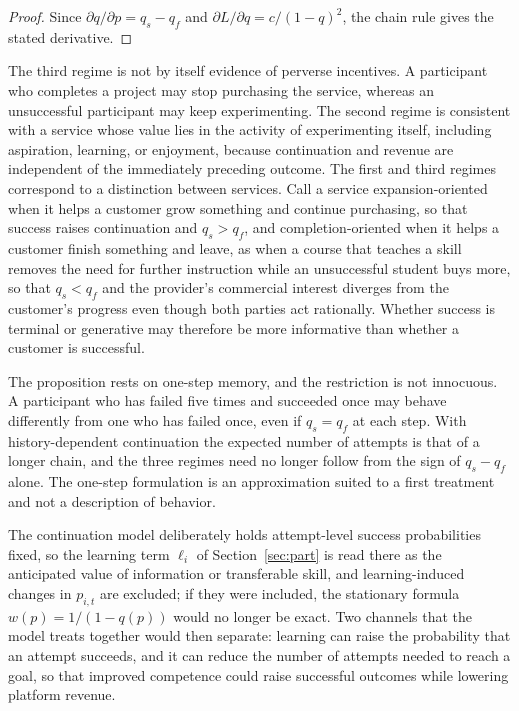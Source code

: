 \documentclass[11pt]{article}
\theoremstyle{remark}
\begin{document}
\begin{proof}
Since $\partial q/\partial p = q_s-q_f$ and $\partial L/\partial q = c/(1-q)^2$, the chain rule gives the stated derivative.
\end{proof}

The third regime is not by itself evidence of perverse incentives. A participant who completes a project may stop purchasing the service, whereas an unsuccessful participant may keep experimenting. The second regime is consistent with a service whose value lies in the activity of experimenting itself, including aspiration, learning, or enjoyment, because continuation and revenue are independent of the immediately preceding outcome. The first and third regimes correspond to a distinction between services. Call a service expansion-oriented when it helps a customer grow something and continue purchasing, so that success raises continuation and $q_s>q_f$, and completion-oriented when it helps a customer finish something and leave, as when a course that teaches a skill removes the need for further instruction while an unsuccessful student buys more, so that $q_s<q_f$ and the provider's commercial interest diverges from the customer's progress even though both parties act rationally. Whether success is terminal or generative may therefore be more informative than whether a customer is successful.

The proposition rests on one-step memory, and the restriction is not innocuous. A participant who has failed five times and succeeded once may behave differently from one who has failed once, even if $q_s=q_f$ at each step. With history-dependent continuation the expected number of attempts is that of a longer chain, and the three regimes need no longer follow from the sign of $q_s-q_f$ alone. The one-step formulation is an approximation suited to a first treatment and not a description of behavior.

The continuation model deliberately holds attempt-level success probabilities fixed, so the learning term $\ell_i$ of Section~\ref{sec:part} is read there as the anticipated value of information or transferable skill, and learning-induced changes in $p_{i,t}$ are excluded; if they were included, the stationary formula $w(p)=1/(1-q(p))$ would no longer be exact. Two channels that the model treats together would then separate: learning can raise the probability that an attempt succeeds, and it can reduce the number of attempts needed to reach a goal, so that improved competence could raise successful outcomes while lowering platform revenue.
\end{document}
